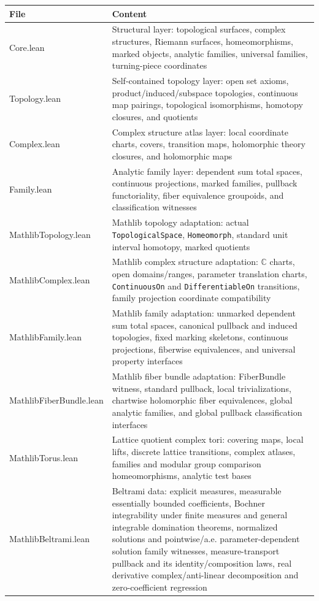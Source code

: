\documentclass[UTF8,a4paper,11pt]{article}
\begin{document}
\begin{center}
\scriptsize
\begin{tabularx}{\textwidth}{>{\ttfamily}lX}
\toprule
File & Content \\
\midrule
Core.lean & Structural layer: topological surfaces, complex structures, Riemann surfaces, homeomorphisms, marked objects, analytic families, universal families, turning-piece coordinates \\
Topology.lean & Self-contained topology layer: open set axioms, product/induced/subspace topologies, continuous map pairings, topological isomorphisms, homotopy closures, and quotients \\
Complex.lean & Complex structure atlas layer: local coordinate charts, covers, transition maps, holomorphic theory closures, and holomorphic maps \\
Family.lean & Analytic family layer: dependent sum total spaces, continuous projections, marked families, pullback functoriality, fiber equivalence groupoids, and classification witnesses \\
MathlibTopology.lean & Mathlib topology adaptation: actual \texttt{TopologicalSpace}, \texttt{Homeomorph}, standard unit interval homotopy, marked quotients \\
MathlibComplex.lean & Mathlib complex structure adaptation: \(\mathbb C\) charts, open domains/ranges, parameter translation charts, \texttt{ContinuousOn} and \texttt{DifferentiableOn} transitions, family projection coordinate compatibility \\
MathlibFamily.lean & Mathlib family adaptation: unmarked dependent sum total spaces, canonical pullback and induced topologies, fixed marking skeletons, continuous projections, fiberwise equivalences, and universal property interfaces \\
MathlibFiberBundle.lean & Mathlib fiber bundle adaptation: FiberBundle witness, standard pullback, local trivializations, chartwise holomorphic fiber equivalences, global analytic families, and global pullback classification interfaces \\
MathlibTorus.lean & Lattice quotient complex tori: covering maps, local lifts, discrete lattice transitions, complex atlases, families and modular group comparison homeomorphisms, analytic test bases \\
MathlibBeltrami.lean & Beltrami data: explicit measures, measurable essentially bounded coefficients, Bochner integrability under finite measures and general integrable domination theorems, normalized solutions and pointwise/a.e. parameter-dependent solution family witnesses, measure-transport pullback and its identity/composition laws, real derivative complex/anti-linear decomposition and zero-coefficient regression \\

\end{tabularx}
\end{center}
\end{document}
